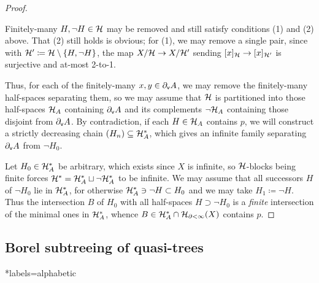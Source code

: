 \documentclass[reqno]{amsart}
\begin{document}
\begin{proof}
        \begin{center}
            \begin{minipage}{0.95\textwidth}
                \begin{observation*}
                    Finitely-many $H,\lnot H\in\mathcal{H}$ may be removed and still satisfy conditions (1) and (2) above. That (2) still holds is obvious; for (1), we may remove a single pair, since with $\mathcal{H}'\coloneqq\mathcal{H}\setminus\left\{H,\lnot H\right\}$, the map $X/\mathcal{H}\to X/\mathcal{H}'$ sending $[x]_{\mathcal{H}}\to[x]_{\mathcal{H}'}$ is surjective and at-most 2-to-1.
            \end{observation*}
            \end{minipage}
        \end{center}
        Thus, for each of the finitely-many $x,y\in\partial_\mathsf{v}A$, we may remove the finitely-many half-spaces separating them, so we may assume that $\mathcal{H}$ is partitioned into those half-spaces $\mathcal{H}_A$ containing $\partial_\mathsf{v}A$ and its complements $\lnot\mathcal{H}_A$ containing those disjoint from $\partial_\mathsf{v}A$. By contradiction, if each $H\in\mathcal{H}_A$ contains $p$, we will construct a strictly decreasing chain $(H_n)\subseteq\mathcal{H}_A^\ast$, which gives an infinite family separating $\partial_\mathsf{v}A$ from $\lnot H_0$.

        Let $H_0\in\mathcal{H}_A^\ast$ be arbitrary, which exists since $X$ is infinite, so $\mathcal{H}$-blocks being finite forces $\mathcal{H}^\ast=\mathcal{H}_A^\ast\sqcup\lnot\mathcal{H}_A^\ast$ to be infinite. We may assume that all successors $H$ of $\lnot H_0$ lie in $\mathcal{H}_A^\ast$, for otherwise $\mathcal{H}_A^\ast\ni\lnot H\subset H_0$ and we may take $H_1\coloneqq\lnot H$. Thus the intersection $B$ of $H_0$ with all half-spaces $H\supset\lnot H_0$ is a \textit{finite} intersection of the minimal ones in $\mathcal{H}_A^\ast$, whence $B\in\mathcal{H}_A^\ast\cap\mathcal{H}_{\partial<\infty}(X)$ contains $p$.
    \end{proof}

    \subsection{Borel subtreeing of quasi-trees}\label{sec:borel_subtreeing_of_quasi-trees}

    \TODO

    \begin{bibdiv}
        \begin{biblist}*{labels={alphabetic}}
        \end{biblist}
    \end{bibdiv}
\end{document}
